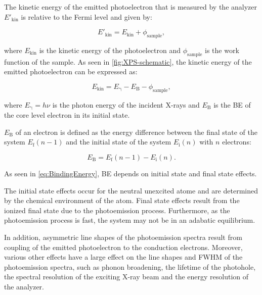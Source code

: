 The kinetic energy of the emitted photoelectron that is measured by the analyzer $E'_\mathrm{kin}$ is relative to the Fermi level and given by:

\begin{equation}
	\label{eq:KineticEnergy2}
	E'_\mathrm{kin} = E_\mathrm{kin} + \phi_\mathrm{sample},
\end{equation}

where $E_\mathrm{kin}$ is the kinetic energy of the photoelectron and $\phi_\mathrm{sample}$ is the work function of the sample. As seen in \autoref{fig:XPS-schematic}, the kinetic energy of the emitted photoelectron can be expressed as:

\begin{equation}
	\label{eq:KineticEnergy}
	E_\mathrm{kin} = E_\mathrm{\gamma} - E_\mathrm{B} - \phi_\mathrm{sample},
\end{equation}

where $E_\mathrm{\gamma}=h\nu$ is the photon energy of the incident X-rays and $E_\mathrm{B}$ is the \ac{BE} of the core level electron in its initial state.

$E_\mathrm{B}$ of an electron is defined as the energy difference between the final state of the system $E_\mathrm{f}(n-1)$ and the initial state of the system $E_\mathrm{i}(n)$ with $n$ electrons:

\begin{equation}
    \label{eq:BindingEnergy}
    E_\mathrm{B}=E_\mathrm{f}(n-1)-E_\mathrm{i}(n).
\end{equation}

As seen in \autoref{eq:BindingEnergy}, \ac{BE} depends on initial state and final state effects.

The initial state effects occur for the neutral unexcited atome and are determined by the chemical environment of the atom. Final state effects result from the ionized final state due to the photoemission process. Furthermore, as the photoemission process is fast, the system may not be in an adabatic equilibrium.\autocite{Woodruff2016}

In addition, asymmetric line shapes of the photoemission spectra result from coupling of the emitted photoelectron to the conduction electrons.\autocite{Moulder1993} Moreover, various other effects have a large effect on the line shapes and \ac{FWHM} of the photoemission spectra, such as phonon broadening, the lifetime of the photohole, the spectral resolution of the exciting X-ray beam and the energy resolution of the analyzer.\autocite{Fairley2021,Moulder1993}

